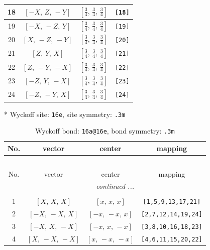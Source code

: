 \documentclass[fleqn,8pt]{jsarticle}
\begin{document}
\begin{longtable}{cccc}
18 & $\left[ - X,\, Z,\, - Y \right]$ & $\left[ \frac{3}{4},\, \frac{3}{4},\, \frac{3}{4} \right]$ & {\tt [18]} \\ \hline
19 & $\left[ - X,\, - Z,\, Y \right]$ & $\left[ \frac{3}{4},\, \frac{3}{4},\, \frac{3}{4} \right]$ & {\tt [19]} \\ \hline
20 & $\left[ X,\, - Z,\, - Y \right]$ & $\left[ \frac{3}{4},\, \frac{3}{4},\, \frac{3}{4} \right]$ & {\tt [20]} \\ \hline
21 & $\left[ Z,\, Y,\, X \right]$ & $\left[ \frac{3}{4},\, \frac{3}{4},\, \frac{3}{4} \right]$ & {\tt [21]} \\ \hline
22 & $\left[ Z,\, - Y,\, - X \right]$ & $\left[ \frac{3}{4},\, \frac{3}{4},\, \frac{3}{4} \right]$ & {\tt [22]} \\ \hline
23 & $\left[ - Z,\, Y,\, - X \right]$ & $\left[ \frac{3}{4},\, \frac{3}{4},\, \frac{3}{4} \right]$ & {\tt [23]} \\ \hline
24 & $\left[ - Z,\, - Y,\, X \right]$ & $\left[ \frac{3}{4},\, \frac{3}{4},\, \frac{3}{4} \right]$ & {\tt [24]} \\
\end{longtable}
* Wyckoff site: {\tt 16e}, site symmetry: {\tt .3m}
\renewcommand{\arraystretch}{1.2}
\begin{longtable}{cccc}
\caption{Wyckoff bond: {\tt 16a@16e}, bond symmetry: {\tt .3m}}
 \\
 \hline \hline
No. & vector & center & mapping \\ \hline \endfirsthead

\multicolumn{3}{l}{\tablename\ \thetable{}} \\
 \hline \hline
No. & vector & center & mapping \\ \hline \endhead

 \hline \hline
\multicolumn{3}{r}{\footnotesize\it continued ...} \\ \endfoot

 \hline \hline
\multicolumn{3}{r}{} \\ \endlastfoot

1 & $\left[ X,\, X,\, X \right]$ & $\left[ x,\, x,\, x \right]$ & {\tt [1,5,9,13,17,21]} \\ \hline
2 & $\left[ - X,\, - X,\, X \right]$ & $\left[ - x,\, - x,\, x \right]$ & {\tt [2,7,12,14,19,24]} \\ \hline
3 & $\left[ - X,\, X,\, - X \right]$ & $\left[ - x,\, x,\, - x \right]$ & {\tt [3,8,10,16,18,23]} \\ \hline
4 & $\left[ X,\, - X,\, - X \right]$ & $\left[ x,\, - x,\, - x \right]$ & {\tt [4,6,11,15,20,22]} \\
\end{longtable}
\end{document}
